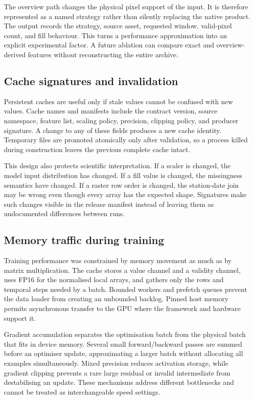 \documentclass[12pt,a4paper]{report}
\begin{document}
The overview path changes the physical pixel support of the input. It is
therefore represented as a named strategy rather than silently replacing the
native product. The output records the strategy, source asset, requested
window, valid-pixel count, and fill behaviour. This turns a performance
approximation into an explicit experimental factor. A future ablation can
compare exact and overview-derived features without reconstructing the entire
archive.

\subsection{Cache signatures and invalidation}
Persistent caches are useful only if stale values cannot be confused with new
values. Cache names and manifests include the contract version, source
namespace, feature list, scaling policy, precision, clipping policy, and
producer signature. A change to any of these fields produces a new cache
identity. Temporary files are promoted atomically only after validation, so a
process killed during construction leaves the previous complete cache intact.

This design also protects scientific interpretation. If a scaler is changed,
the model input distribution has changed. If a fill value is changed, the
missingness semantics have changed. If a raster row order is changed, the
station-date join may be wrong even though every array has the expected shape.
Signatures make such changes visible in the release manifest instead of
leaving them as undocumented differences between runs.

\subsection{Memory traffic during training}
Training performance was constrained by memory movement as much as by matrix
multiplication. The cache stores a value channel and a validity channel, uses
FP16 for the normalised local arrays, and gathers only the rows and temporal
steps needed by a batch. Bounded workers and prefetch queues prevent the data
loader from creating an unbounded backlog. Pinned host memory permits
asynchronous transfer to the GPU where the framework and hardware support it.

Gradient accumulation separates the optimisation batch from the physical batch
that fits in device memory. Several small forward/backward passes are summed
before an optimiser update, approximating a larger batch without allocating
all examples simultaneously. Mixed precision reduces activation storage, while
gradient clipping prevents a rare large residual or invalid intermediate from
destabilising an update. These mechanisms address different bottlenecks and
cannot be treated as interchangeable speed settings.
\end{document}
